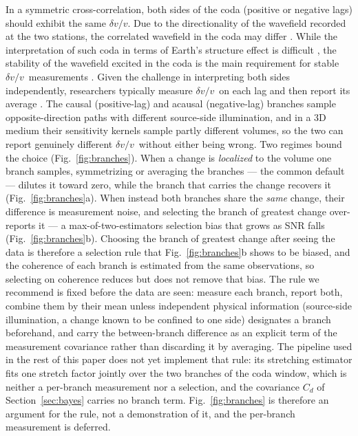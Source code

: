 \documentclass[
  referee]{gji}
\providecommand{\dvv}{\ensuremath{\delta v/v}}
\begin{document}
In a symmetric cross-correlation, both sides of the coda (positive or
negative lags) should exhibit the same \dvv. Due to the directionality
of the wavefield recorded at the two stations, the correlated wavefield
in the coda may differ \citep{Stehly2006}. While the interpretation of
such coda in terms of Earth's structure effect is difficult
\citep{Snieder2002}, the stability of the wavefield excited in the coda
is the main requirement for stable \dvv~measurements
\citep{Hadziioannou2009}. Given the challenge in interpreting both sides
independently, researchers typically measure \dvv~on each lag and then
report its average \citep{Kidiwela2026}. The causal (positive-lag) and
acausal (negative-lag) branches sample opposite-direction paths with
different source-side illumination, and in a 3D medium their sensitivity
kernels sample partly different volumes, so the two can report genuinely
different \dvv~without either being wrong. Two regimes bound the choice
(Fig.~\ref{fig:branches}). When a change is \emph{localized} to the
volume one branch samples, symmetrizing or averaging the branches ---
the common default --- dilutes it toward zero, while the branch that
carries the change recovers it (Fig.~\ref{fig:branches}a). When instead
both branches share the \emph{same} change, their difference is
measurement noise, and selecting the branch of greatest change
over-reports it --- a max-of-two-estimators selection bias that grows as
SNR falls (Fig.~\ref{fig:branches}b). Choosing the branch of greatest
change after seeing the data is therefore a selection rule that
Fig.~\ref{fig:branches}b shows to be biased, and the coherence of each
branch is estimated from the same observations, so selecting on
coherence reduces but does not remove that bias. The rule we recommend
is fixed before the data are seen: measure each branch, report both,
combine them by their mean unless independent physical information
(source-side illumination, a change known to be confined to one side)
designates a branch beforehand, and carry the between-branch difference
as an explicit term of the measurement covariance rather than discarding
it by averaging. The pipeline used in the rest of this paper does not
yet implement that rule: its stretching estimator fits one stretch
factor jointly over the two branches of the coda window, which is
neither a per-branch measurement nor a selection, and the covariance
\(C_d\) of Section~\ref{sec:bayes} carries no branch term.
Fig.~\ref{fig:branches} is therefore an argument for the rule, not a
demonstration of it, and the per-branch measurement is deferred.
\end{document}
